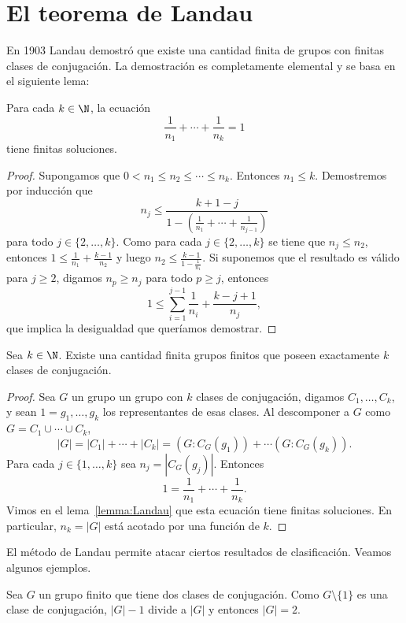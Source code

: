 \chapter{El teorema de Landau}

En 1903 Landau demostró que existe una cantidad finita de grupos
con finitas clases de conjugación. La demostración es completamente 
elemental y se basa en el siguiente lema: 

\begin{lemma}[Landau]
  \label{lemma:Landau}
  Para cada $k\in\N$, la ecuación 
  \[
	\frac{1}{n_1}+\cdots+\frac{1}{n_k}=1
  \]
  tiene finitas soluciones.
\end{lemma}

\begin{proof}
  Supongamos que $0<n_1\leq n_2\leq\cdots\leq n_k$.  Entonces $n_1\leq k$.
  Demostremos por inducción que 
  \[
    n_j\leq \frac{k+1-j}{1-\left(\frac{1}{n_1}+\cdots+\frac{1}{n_{j-1}}\right)}
  \]
  para todo $j\in\{2,\dots,k\}$. Como para cada $j\in\{2,\dots,k\}$ se tiene
  que $n_j\leq n_2$, entonces $1\leq \frac{1}{n_1}+\frac{k-1}{n_2}$ y luego
  $n_2\leq \frac{k-1}{1-\frac{1}{n_1}}$. Si suponemos que el resultado es
  válido para $j\geq2$, digamos $n_p\geq n_j$ para todo $p\geq j$, entonces
  \[
	1\leq \sum_{i=1}^{j-1}\frac{1}{n_i}+\frac{k-j+1}{n_j},
  \]
  que implica la desigualdad que queríamos demostrar.
\end{proof}

\begin{theorem}[Landau]
  Sea $k\in\N$. Existe una cantidad finita grupos finitos que poseen exactamente $k$
  clases de conjugación.
\end{theorem}

\begin{proof}
  Sea $G$ un grupo un grupo con $k$ clases de conjugación, digamos
  $C_1,\dots,C_k$, y sean $1=g_1,\dots,g_k$ los representantes de esas clases.
  Al descomponer a $G$ como $G=C_1\cup\cdots\cup C_k$, 
  \[
    |G|=|C_1|+\cdots+|C_k|=(G:C_G(g_1))+\cdots(G:C_G(g_k)).
  \]
  Para cada $j\in\{1,\dots,k\}$ sea $n_j=|C_G(g_j)|$. Entonces 
  \[
	1=\frac{1}{n_1}+\cdots+\frac{1}{n_k}.
  \]
  Vimos en el lema~\ref{lemma:Landau} que esta ecuación tiene finitas
  soluciones.  En particular, $n_k=|G|$ está acotado por una función de $k$.
\end{proof}

El método de Landau permite atacar ciertos resultados de clasificación. 
Veamos algunos ejemplos. 

\begin{example}
  Sea $G$ un grupo finito que tiene dos clases de conjugación. Como 
  $G\setminus\{1\}$ es una clase de conjugación, $|G|-1$ divide a
  $|G|$ y entonces $|G|=2$.
\end{example}

